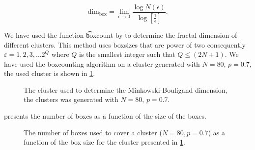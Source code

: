 

	\begin{equation}
		\text{dim}_{\text{box}} = \lim_{\epsilon \to 0} \frac{\log N(\epsilon)}{\log\left[ \frac{1}{\epsilon} \right]}.
	\end{equation}

We have used the function \t{boxcount} by \textcite{boxCounting} to determine the fractal dimension of different clusters. This method uses boxsizes that are power of two consequently $\varepsilon = 1, 2, 3, \dotsc 2^Q$ where $Q$ is the smallest integer such that $Q \leq (2N + 1)$. We have used the boxcounting algorithm on a cluster generated with $N= 80$, $p = 0.7$, the used cluster is shown in \cref{fig:exp_fractal:cluster}.

\begin{figure}
	\centering
	\caption{The cluster used to determine the Minkowski-Bouligand dimension, the clusters was generated with $N = 80$, $p = 0.7$.}
	\label{fig:exp_fractal:cluster}
\end{figure}

 presents the number of boxes as a function of the size of the boxes. 

\begin{figure}
	\centering
	\caption{The number of boxes used to cover a cluster ($N = 80, p = 0.7$) as a function of the box size for the cluster presented in \cref{fig:exp_fractal:cluster}.}
	\label{fig:exp_fractal:minkowskiDimension}
\end{figure}


